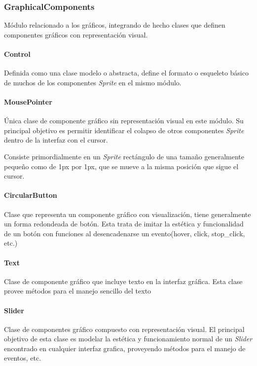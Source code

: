 \documentclass[]{article}
\begin{document}
			
			
			
		\subsubsection{GraphicalComponents}
			Módulo relacionado a los gráficos, integrando de hecho clases que definen componentes gráficos con representación visual.
			
			\paragraph{Control}
				Definida como una clase modelo o abstracta, define el formato o esqueleto básico de muchos de los componentes \textit{Sprite} en el mismo módulo.
				
			\paragraph{MousePointer}
				Única clase de componente gráfico sin representación visual en este módulo. Su principal objetivo es permitir identificar el colapso de otros componentes \textit{Sprite} dentro de la interfaz con el cursor.
				
				Consiste primordialmente en un \textit{Sprite} rectángulo de una tamaño generalmente pequeño como de 1px por 1px, que se mueve a la misma posición que sigue el cursor.
				
			\paragraph{CircularButton}
				Clase que representa un componente gráfico con visualización, tiene generalmente un forma redondeada de botón. Esta trata de imitar la estética y funcionalidad de un botón con funciones al desencadenarse un evento(hover, click, stop\_click, etc.)
				
			\paragraph{Text}
				Clase de componente gráfico que incluye texto en la interfaz gráfica. Esta clase provee métodos para el manejo sencillo del texto
				
			\paragraph{Slider}
				Clase de componentes gráfico compuesto con representación visual. El principal objetivo de esta clase es modelar la estética y funcionamiento normal de un \textit{Slider} encontrado en cualquier interfaz grafica, proveyendo métodos para el manejo de eventos, etc.
				
\end{document}
